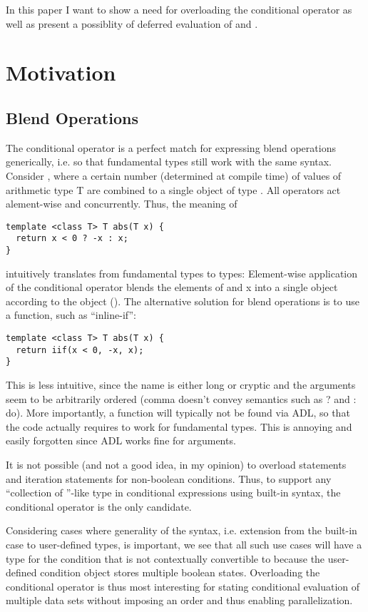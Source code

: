 In this paper I want to show a need for overloading the conditional operator as well as present a possiblity of deferred evaluation of  and .

\section{Motivation}
\subsection{Blend Operations}
The conditional operator is a perfect match for expressing blend operations generically, i.e. so that fundamental types still work with the same syntax.
Consider \textcite{P0214R8}, where a certain number (determined at compile time) of values of arithmetic type \type T are combined to a single object of type .
All operators act alement-wise and concurrently.
Thus, the meaning of
\smallskip\begin{lstlisting}[style=Vc]
template <class T> T abs(T x) {
  return x < 0 ? -x : x;
}
\end{lstlisting}
intuitively translates from fundamental types to  types:
Element-wise application of the conditional operator blends the elements of  and \code x into a single  object according to the  object ().
The alternative solution for  blend operations is to use a function, such as “inline-if”:
\smallskip\begin{lstlisting}[style=Vc]
template <class T> T abs(T x) {
  return iif(x < 0, -x, x);
}
\end{lstlisting}
This is less intuitive, since the name is either long or cryptic and the arguments seem to be arbitrarily ordered (comma doesn't convey semantics such as \code ? and \code : do).
More importantly, a function will typically not be found via ADL, so that the code actually requires  to work for fundamental types.
This is annoying and easily forgotten since ADL works fine for  arguments.

It is not possible (and not a good idea, in my opinion) to overload  statements and iteration statements for non-boolean conditions.
Thus, to support any “collection of \bool{}”-like type in conditional expressions using built-in syntax, the conditional operator is the only candidate.

Considering cases where generality of the syntax, i.e. extension from the built-in case to user-defined types, is important, we see that all such use cases will have a type for the condition that is not contextually convertible to \bool because the user-defined condition object stores multiple boolean states.
Overloading the conditional operator is thus most interesting for stating conditional evaluation of multiple data sets without imposing an order and thus enabling parallelization.

